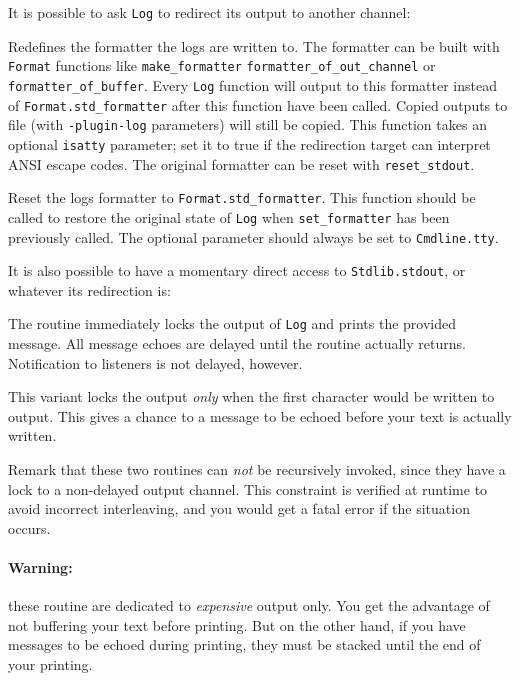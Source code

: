 It is possible to ask \lstinline{Log} to redirect its output to
another channel:
\begin{description}
  Redefines the formatter the logs are written to. The formatter can be
  built with \lstinline{Format} functions like \lstinline{make_formatter}
  \lstinline{formatter_of_out_channel} or \lstinline{formatter_of_buffer}.
  Every \lstinline{Log} function will output to this formatter instead of
  \lstinline{Format.std_formatter} after this function have been called. Copied
  outputs to file (with \lstinline{-plugin-log} parameters) will still be
  copied. This function takes an optional \lstinline{isatty} parameter; set it
  to true if the redirection target can interpret ANSI escape codes.
  The original formatter can be reset with \lstinline{reset_stdout}.

  Reset the logs formatter to \lstinline{Format.std_formatter}. This function
  should be called to restore the original state of \lstinline{Log} when
  \lstinline{set_formatter} has been previously called. The optional parameter
  should always be set to \lstinline{Cmdline.tty}.
\end{description}

It is also possible to have a momentary direct access to
\lstinline{Stdlib.stdout}, or whatever its redirection is:
\begin{description}
  The routine immediately locks the output of \lstinline{Log} and
  prints the provided message. All message echoes are delayed until
  the routine actually returns. Notification to listeners is not
  delayed, however.

  This variant locks the output \emph{only} when the first character
  would be written to output. This gives a chance to a message to be echoed before
  your text is actually written.
\end{description}

Remark that these two routines can \emph{not} be recursively invoked,
since they have a lock to a non-delayed output channel. This
constraint is verified at runtime to avoid incorrect interleaving, and
you would get a fatal error if the situation occurs.

\paragraph{Warning:} these routine are dedicated to \emph{expensive}
output only. You get the advantage of not buffering your text before
printing. But on the other hand, if you have messages to be echoed
during printing, they must be stacked until the end of your printing.

